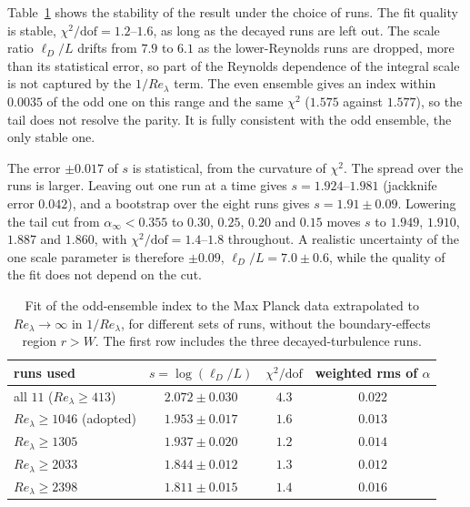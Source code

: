 \documentclass[aip,pof,preprint,floatfix,nofootinbib,amsmath,amssymb]{revtex4-2}
\begin{document}
Table~\ref{tab:extrap} shows the stability of the result under the choice of runs. The fit quality is stable,
$\chi^2/\mathrm{dof}=1.2$--$1.6$, as long as the decayed runs are left out. The scale ratio
$\ell_D/L$ drifts from $7.9$ to $6.1$ as the lower-Reynolds runs are dropped, more than its statistical error, so part of the
Reynolds dependence of the integral scale is not captured by the $1/Re_\lambda$ term. The even ensemble gives an index within
$0.0035$ of the odd one on this range and the same $\chi^2$ ($1.575$ against $1.577$), so the tail does not resolve the parity.
It is fully consistent with the odd ensemble, the only stable one.

The error $\pm0.017$ of $s$ is statistical, from the curvature of $\chi^2$. The spread over the runs is larger. Leaving
out one run at a time gives $s=1.924$--$1.981$ (jackknife error $0.042$), and a bootstrap over the eight runs gives
$s=1.91\pm0.09$. Lowering the tail cut from $\alpha_\infty<0.355$ to $0.30$, $0.25$, $0.20$ and $0.15$ moves $s$ to $1.949$,
$1.910$, $1.887$ and $1.860$, with $\chi^2/\mathrm{dof}=1.4$--$1.8$ throughout. A realistic uncertainty of the one scale
parameter is therefore $\pm0.09$, $\ell_D/L=7.0\pm0.6$, while the quality of the fit does not depend on the cut.

\begin{table}[tbp]
    \centering
    \begin{tabular}{lccc}
    \toprule
    runs used & $s=\log(\ell_D/L)$ & $\chi^2/\mathrm{dof}$ & weighted rms of $\alpha$\\
    \midrule
    all $11$ ($Re_\lambda\ge413$) & $2.072\pm0.030$ & $4.3$ & $0.022$\\
    $Re_\lambda\ge1046$ (adopted) & $1.953\pm0.017$ & $1.6$ & $0.013$\\
    $Re_\lambda\ge1305$ & $1.937\pm0.020$ & $1.2$ & $0.014$\\
    $Re_\lambda\ge2033$ & $1.844\pm0.012$ & $1.3$ & $0.012$\\
    $Re_\lambda\ge2398$ & $1.811\pm0.015$ & $1.4$ & $0.016$\\
    \bottomrule
    \end{tabular}
    \caption{Fit of the odd-ensemble index to the Max Planck data extrapolated to $Re_\lambda\to\infty$ in $1/Re_\lambda$, for
    different sets of runs, without the boundary-effects region $r>W$. The first row includes the three decayed-turbulence runs.}
    \label{tab:extrap}
\end{table}
\end{document}
